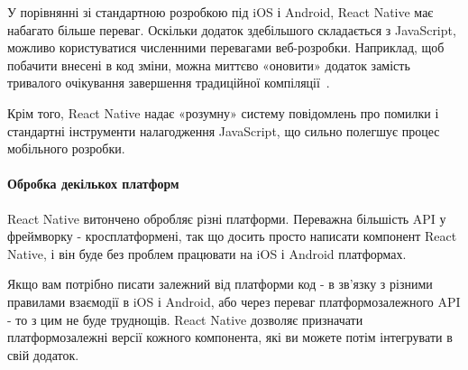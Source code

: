 У порівнянні зі стандартною розробкою під iOS і Android, React Native має набагато більше переваг. Оскільки додаток здебільшого складається з JavaScript, можливо користуватися численними перевагами веб-розробки. Наприклад, щоб побачити внесені в код зміни, можна миттєво «оновити» додаток замість тривалого очікування завершення традиційної компіляції~\cite{robinwieruch2018}. 

Крім того, React Native надає «розумну» систему повідомлень про помилки і стандартні інструменти налагодження JavaScript, що сильно полегшує процес мобільного розробки.

\paragraph{Обробка декількох платформ}

React Native витончено обробляє різні платформи. Переважна більшість API у фреймворку - кросплатформені, так що досить просто написати компонент React Native, і він буде без проблем працювати на iOS і Android платформах.

Якщо вам потрібно писати залежний від платформи код - в зв'язку з різними правилами взаємодії в iOS і Android, або через переваг платформозалежного API - то з цим не буде труднощів. React Native дозволяє призначати платформозалежні версії кожного компонента, які ви можете потім інтегрувати в свій додаток.
